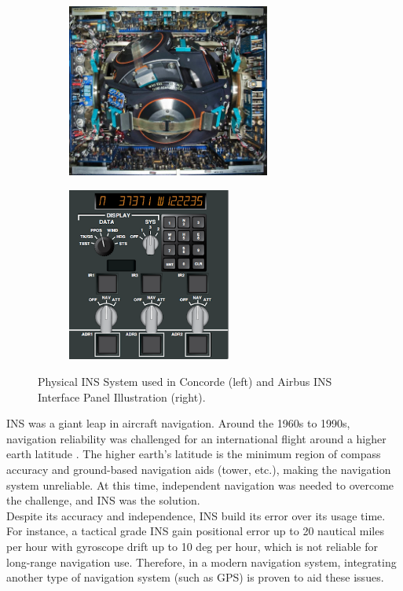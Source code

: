 \begin{figure}[!ht]
\centering
%    
  \begin{subfigure}[b]{0.45\textwidth}
    \includegraphics[height=5.7cm]{Figures/INS_Concorde.jpg}
  \end{subfigure}
%
  \begin{subfigure}[b]{0.4\textwidth}
    \includegraphics[height=5.7cm]{Figures/INS-IRS_InterfacePanel.png}
  \end{subfigure}
%  
  \caption{Physical INS System used in Concorde \cite{AnonymousUAVNavigation} (left) and Airbus INS Interface Panel Illustration \cite{AircraftSystems} (right).}
    \label{fig:concordeINS}
\end{figure}

\noindent INS was a giant leap in aircraft navigation. Around the 1960s to 1990s, navigation reliability was challenged for an international flight around a higher earth latitude \cite{Anonymous1964InertialNavigation}. The higher earth's latitude is the minimum region of compass accuracy and ground-based navigation aids (tower, etc.), making the navigation system unreliable. At this time, independent navigation was needed to overcome the challenge, and INS was the solution.\\

\noindent Despite its accuracy and independence, INS build its error over its usage time. For instance, a tactical grade INS gain positional error up to 20 nautical miles per hour with gyroscope drift up to 10 deg per hour, which is not reliable for long-range navigation use. Therefore, in a modern navigation system, integrating another type of navigation system (such as GPS) is proven to aid these issues.\\

